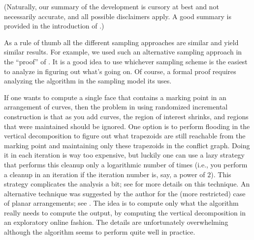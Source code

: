 (Naturally, our summary of the development is cursory at best and not
necessarily accurate, and all possible disclaimers apply. A good
summary is provided in the introduction of \cite{s-barga-93}.)

  As a rule of thumb all the different
sampling approaches are similar and yield similar results.  For
example, we used such an alternative sampling approach in the
``proof'' of .  It is a good idea to use
whichever sampling scheme is the easiest to analyze in figuring out
what's going on. Of course, a formal proof requires analyzing the
algorithm in the sampling model its uses.


If one wants to compute a single face that contains a marking point in
an arrangement of curves, then the problem in using randomized
incremental construction is that as you add curves, the region of
interest shrinks, and regions that were maintained should be
ignored. One option is to perform flooding in the vertical
decomposition to figure out what trapezoids are still reachable from
the marking point and maintaining only these trapezoids in the
conflict graph. Doing it in each iteration is way too expensive, but
luckily one can use a lazy strategy that performs this cleanup only a
logarithmic number of times (i.e., you perform a cleanup in an
iteration if the iteration number is, say, a power of $2$). This
strategy complicates the analysis a bit; see \cite{bds-lric-95} for
more details on this 
 technique. An alternative
technique was suggested by the author for the (more restricted) case
of planar arrangements; see \cite{h-twpa-00}. The idea is to compute
only what the algorithm really needs to compute the output, by
computing the vertical decomposition in an exploratory online
fashion. The details are unfortunately overwhelming although the
algorithm seems to perform quite well in practice.

